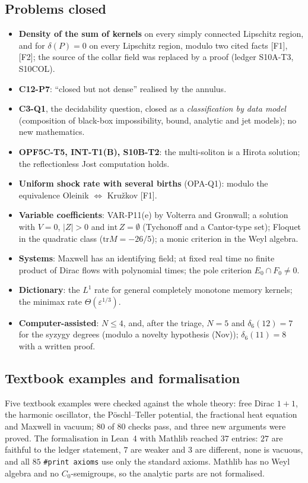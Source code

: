 \documentclass[11pt]{article}
\theoremstyle{plain}
\theoremstyle{definition}
\theoremstyle{remark}
\newcommand{\led}[1]{\textcolor{cG}{\textsf{\footnotesize(ledger #1)}}}
\begin{document}
\subsection{Problems closed}

\begin{itemize}
\item \textbf{Density of the sum of kernels} on every simply connected Lipschitz region, and for $\delta(P)=0$ on every Lipschitz region, modulo two cited facts [F1], [F2]; the source of the collar field was replaced by a proof \led{S10A-T3, S10COL}.
\item \textbf{C12-P7}: ``closed but not dense'' realised by the annulus.
\item \textbf{C3-Q1}, the decidability question, closed as a \emph{classification by data model} (composition of black-box impossibility, bound, analytic and jet models); no new mathematics.
\item \textbf{OPF5C-T5, INT-T1(B), S10B-T2}: the multi-soliton is a Hirota solution; the reflectionless Jost computation holds.
\item \textbf{Uniform shock rate with several births} (OPA-Q1): modulo the equivalence Oleinik $\Leftrightarrow$ Kru\v zkov [F1].
\item \textbf{Variable coefficients}: VAR-P11(e) by Volterra and Gronwall; a solution with $V=0$, $|Z|>0$ and $\mathrm{int}\,Z=\emptyset$ (Tychonoff and a Cantor-type set); Floquet in the quadratic class ($\mathrm{tr}M=-26/5$); a monic criterion in the Weyl algebra.
\item \textbf{Systems}: Maxwell has an identifying field; at fixed real time no finite product of Dirac flows with polynomial times; the pole criterion $E_0\cap F_0\ne0$.
\item \textbf{Dictionary}: the $L^1$ rate for general completely monotone memory kernels; the minimax rate $\Theta(\varepsilon^{1/3})$.
\item \textbf{Computer-assisted}: $N\le4$, and, after the triage, $N=5$ and $\delta_6(12)=7$ for the syzygy degrees (modulo a novelty hypothesis (Nov)); $\delta_6(11)=8$ with a written proof.
\end{itemize}

\subsection{Textbook examples and formalisation}

Five textbook examples were checked against the whole theory: free Dirac $1+1$, the harmonic oscillator, the P\"oschl--Teller potential, the fractional heat equation and Maxwell in vacuum; $80$ of $80$ checks pass, and three new arguments were proved. The formalisation in Lean~4 with Mathlib reached $37$ entries: $27$ are faithful to the ledger statement, $7$ are weaker and $3$ are different, none is vacuous, and all $85$ \texttt{\#print axioms} use only the standard axioms. Mathlib has no Weyl algebra and no $C_0$-semigroups, so the analytic parts are not formalised.
\end{document}
